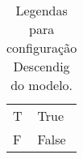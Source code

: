 \begin{table}
    \centering
    \caption{Legendas para configuração Descendig do modelo.}
    \label{tab:descending}
    \begin{tabular}{ll}
        \hline
        T & True  \\
        F & False \\
        \hline
    \end{tabular}
\end{table}
